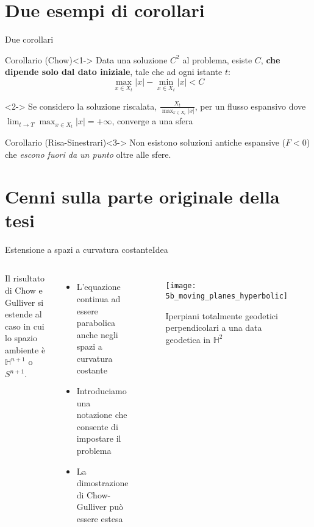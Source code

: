 \section{Due esempi di corollari}

\begin{frame}{Due corollari}{}
	\begin{block}{Corollario (Chow)}<1->
		Data una soluzione $C^2$ al problema, esiste $C$, \textbf{che dipende solo dal dato iniziale}, tale che ad ogni istante $t$:
		\begin{equation}
			\max_{x\in X_t} |x| - \min_{x\in X_t} |x| <C
		\end{equation}
	\end{block}
	\begin{block}{}<2->
		Se considero la soluzione riscalata, $\frac{X_t}{\max_{x\in X_t} |x|}$, per un flusso espansivo dove $\lim_{t\rightarrow T}\max_{x\in X_t} |x| = +\infty$, converge a una sfera 
	\end{block}
	\begin{block}{Corollario (Risa-Sinestrari)}<3->
		Non esistono soluzioni antiche espansive ($F<0$) che \textit{escono fuori da un punto} oltre alle sfere. 
	\end{block}
\end{frame}

\section{Cenni sulla parte originale della tesi}
\begin{frame}{Estensione a spazi a curvatura costante}{Idea}
	\begin{columns}
		Il risultato di Chow e Gulliver si estende al caso in cui lo spazio ambiente è $\mathbb{H}^{n+1}$ o $S^{n+1}$. 
		\begin{itemize}
			\item<1-> L'equazione continua ad essere parabolica anche negli spazi a curvatura costante
			\item<2-> Introduciamo una notazione che consente di impostare il problema
			\item<3-> La dimostrazione di Chow-Gulliver può essere estesa
		\end{itemize}
		\begin{figure}
			\begin{center}
				\texttt{[image: 5b\_moving\_planes\_hyperbolic]}
				\caption{Iperpiani totalmente geodetici perpendicolari a una data geodetica in $\mathbb{H}^2$}
			\end{center}
		\end{figure}
	\end{columns}
\end{frame}

